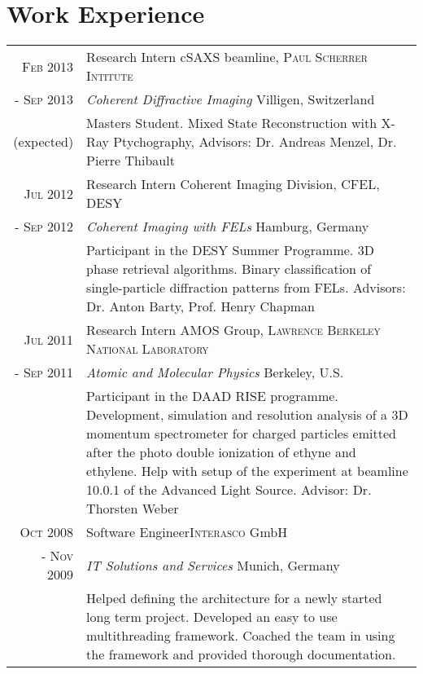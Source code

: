 \documentclass[a4paper,10pt]{article}
\begin{document}
\section{Work Experience}
\begin{tabularx}{19cm}{rX}

 \textsc{Feb 2013} & Research Intern \hfill cSAXS beamline, \textsc{Paul Scherrer Intitute}\\
\textsc{- Sep 2013} &\emph{Coherent Diffractive Imaging} \hfill Villigen, Switzerland\\
(expected)&\footnotesize{Masters Student. Mixed State Reconstruction with X-Ray Ptychography, Advisors: Dr. Andreas Menzel, Dr. Pierre Thibault}\vspace{2mm}\\ 

 \textsc{Jul 2012} & Research Intern \hfill Coherent Imaging Division, \textsc{CFEL, DESY}\\
\textsc{- Sep 2012} &\emph{Coherent Imaging with FELs} \hfill Hamburg, Germany\\
&\footnotesize{Participant in the DESY Summer Programme. 3D phase retrieval algorithms. Binary classification of single-particle diffraction patterns from FELs. Advisors: Dr. Anton Barty, Prof. Henry Chapman}\vspace{2mm}\\ 

 \textsc{Jul 2011} & Research Intern \hfill AMOS Group, \textsc{Lawrence Berkeley National Laboratory}\\
\textsc{- Sep 2011} &\emph{Atomic and Molecular Physics} \hfill Berkeley, U.S.\\
&\footnotesize{Participant in the DAAD RISE programme. Development, simulation and resolution analysis of a 3D momentum spectrometer for charged particles emitted
after the photo double ionization of ethyne and ethylene. Help with setup of the experiment at beamline 10.0.1 of
the Advanced Light Source. Advisor: Dr. Thorsten Weber}\vspace{2mm}\\ 

 \textsc{Oct 2008} & Software Engineer\hfill \textsc{Interasco} GmbH
 \\\textsc{- Nov 2009}&\emph{IT Solutions and Services} \hfill Munich, Germany\\&\footnotesize{Helped defining the architecture for a newly started long term project. Developed an easy to use multithreading framework. Coached the team in using the framework and provided thorough documentation.}\vspace{2mm}\\ 


\end{tabularx}
\end{document}
